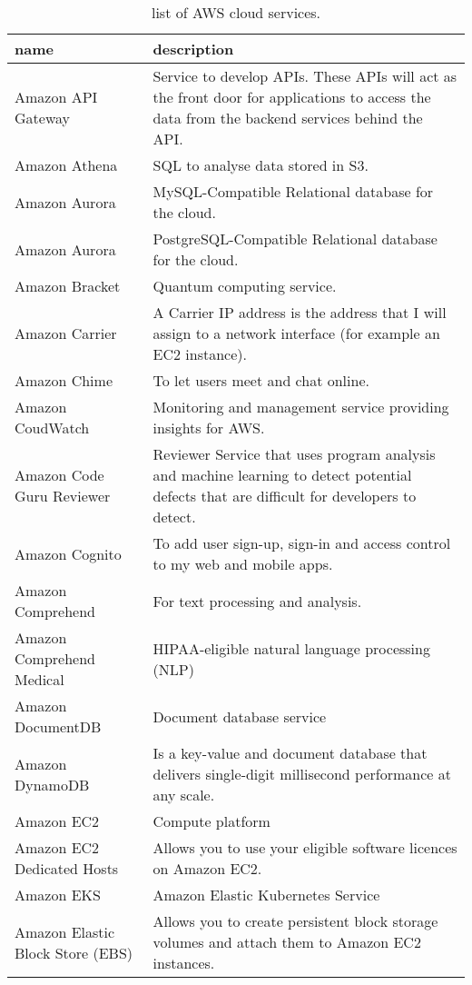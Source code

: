 \documentclass[]{book}
\begin{document}
\begin{table}

\caption{\label{tab:unnamed-chunk-47}list of AWS cloud services.}
\centering
\begin{tabular}[t]{ll}
\toprule
name & description\\
\midrule
Amazon API Gateway & Service to develop APIs. These APIs will act as the front door for applications to access the data from the backend services behind the API.\\
Amazon Athena & SQL to analyse data stored in S3.\\
Amazon Aurora & MySQL-Compatible    Relational database for the cloud.\\
Amazon Aurora & PostgreSQL-Compatible   Relational database for the cloud.\\
Amazon Bracket & Quantum computing service.\\
\addlinespace
Amazon Carrier & A Carrier IP address is the address that I will assign to a network interface (for example an EC2 instance).\\
Amazon Chime & To let users meet and chat online.\\
Amazon CoudWatch & Monitoring and management service providing insights for AWS.\\
Amazon Code Guru Reviewer & Reviewer    Service that uses program analysis and machine learning to detect potential defects that are difficult for developers to detect.\\
Amazon Cognito & To add user sign-up, sign-in and access control to my web and mobile apps.\\
\addlinespace
Amazon Comprehend & For text processing and analysis.\\
Amazon Comprehend Medical & HIPAA-eligible natural language processing (NLP)\\
Amazon DocumentDB & Document database service\\
Amazon DynamoDB & Is a key-value and document database that delivers single-digit millisecond performance at any scale.\\
Amazon EC2 & Compute platform\\
\addlinespace
Amazon EC2 Dedicated Hosts & Allows you to use your eligible software licences on Amazon EC2.\\
Amazon EKS & Amazon Elastic Kubernetes Service\\
Amazon Elastic Block Store (EBS) & Allows you to create persistent block storage volumes and attach them to Amazon EC2 instances.\\

\end{tabular}
\end{table}
\end{document}
